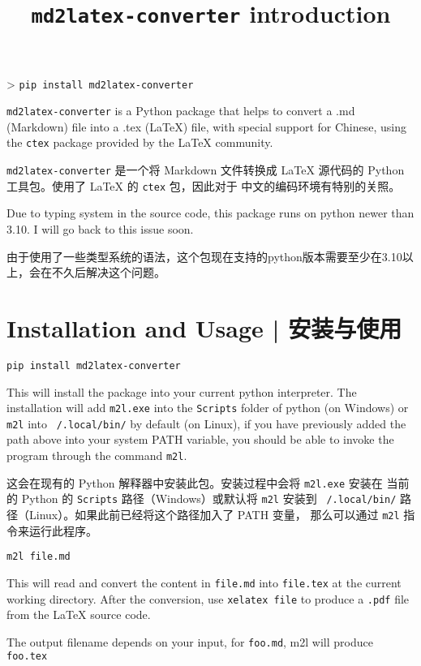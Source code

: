 \documentclass{ctexart}
\title{\texttt{md2latex-converter} introduction }
\begin{document}
	\maketitle

	> \texttt{pip install md2latex-converter}

	\texttt{md2latex-converter} is a Python package that helps to convert a .md (Markdown) file into a .tex (LaTeX) file, with special support for Chinese, using the \texttt{ctex} package provided by the LaTeX community.

	\texttt{md2latex-converter} 是一个将 Markdown 文件转换成 LaTeX 源代码的 Python 工具包。使用了 LaTeX 的 \texttt{ctex} 包，因此对于 中文的编码环境有特别的关照。

	Due to typing system in the source code, this package runs on python newer than 3.10. I will go back to this issue soon.

	由于使用了一些类型系统的语法，这个包现在支持的python版本需要至少在3.10以上，会在不久后解决这个问题。

	\section{Installation and Usage | 安装与使用}

	\texttt{pip install md2latex-converter}

	This will install the package into your current python interpreter. The installation will add \texttt{m2l.exe} into the \texttt{Scripts} folder of python (on Windows) or \texttt{m2l} into \texttt{~/.local/bin/} by default (on Linux), if you have previously added the path above into your system PATH variable, you should be able to invoke the program through the command \texttt{m2l}.

	这会在现有的 Python 解释器中安装此包。安装过程中会将 \texttt{m2l.exe} 安装在 当前的 Python 的 \texttt{Scripts} 路径（Windows）或默认将 \texttt{m2l} 安装到 \texttt{~/.local/bin/} 路径（Linux）。如果此前已经将这个路径加入了 PATH 变量， 那么可以通过 \texttt{m2l} 指令来运行此程序。

	\texttt{m2l file.md}

	This will read and convert the content in \texttt{file.md} into \texttt{file.tex} at the current working directory. After the conversion, use \texttt{xelatex file} to produce a \texttt{.pdf} file from the LaTeX source code.

	The output filename depends on your input, for \texttt{foo.md}, m2l will produce \texttt{foo.tex}
\end{document}
